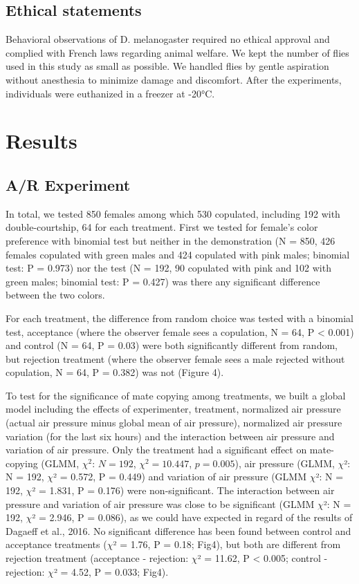 \documentclass[a4paper, 12pt]{article}
\begin{document}
	\subsection{Ethical statements}

	Behavioral observations of D. melanogaster required no ethical approval and complied with French laws regarding animal welfare. We kept the number of flies used in this study as small as possible. We handled flies by gentle aspiration without anesthesia to minimize damage and discomfort. After the experiments, individuals were euthanized in a freezer at -20°C.

	\section{Results}

	\subsection{A/R Experiment}
	\label{subsec:AR-experiment}

	In total, we tested 850 females among which 530 copulated, including 192 with double-courtship, 64 for each treatment. First we tested for female's color preference with binomial test but neither in the demonstration (N = 850, 426 females copulated with green males and 424 copulated with pink males; binomial test: P = 0.973) nor the test (N = 192, 90 copulated with pink and 102 with green males; binomial test: P = 0.427) was there any significant difference between the two colors.

	For each treatment, the difference from random choice was tested with a binomial test, acceptance (where the observer female sees a copulation, N = 64, P {\textless} 0.001) and control (N = 64, P = 0.03) were both significantly different from random, but rejection treatment (where the observer female sees a male rejected without copulation, N = 64, P = 0.382) was not (Figure 4).

	To test for the significance of mate copying among treatments, we built a global model including the effects of experimenter, treatment, normalized air pressure (actual air pressure minus global mean of air pressure), normalized air pressure variation (for the last six hours) and the interaction between air pressure and variation of air pressure. Only the treatment had a significant effect on mate-copying (GLMM, $\chi^2$: $N = 192$, $\chi^2 = 10.447$, $p = 0.005$), air pressure (GLMM, $\chi $²: N = 192, $\chi $² = 0.572, P = 0.449) and variation of air pressure (GLMM $\chi $²: N = 192, $\chi $² = 1.831, P = 0.176) were non-significant. The interaction between air pressure and variation of air pressure was close to be significant (GLMM $\chi $²: N = 192, $\chi $² = 2.946, P = 0.086), as we could have expected in regard of the results of Dagaeff et al., 2016. No significant difference has been found between control and acceptance treatments ($\chi $² = 1.76, P = 0.18; Fig4), but both are different from rejection treatment (acceptance - rejection: $\chi $² = 11.62, P {\textless} 0.005; control - rejection: $\chi $² = 4.52, P = 0.033; Fig4).
	
\end{document}

